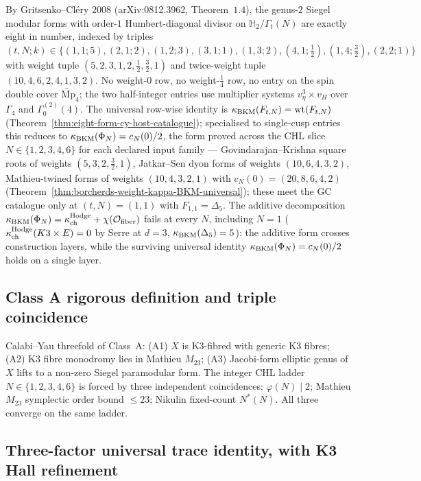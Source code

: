 By Gritsenko--Cl\'ery $2008$ (arXiv:0812.3962, Theorem~$1.4$), the
genus-$2$ Siegel modular forms with order-$1$ Humbert-diagonal divisor
on $\mathbb{H}_2/\Gamma_t(N)$ are exactly eight in number, indexed by
triples $(t, N; k) \in \{(1,1;5),(2,1;2),(1,2;3),(3,1;1),(1,3;2),
(4,1;\tfrac12),(1,4;\tfrac32),(2,2;1)\}$ with weight tuple
$(5, 2, 3, 1, 2, \tfrac12, \tfrac32, 1)$ and twice-weight tuple
$(10, 4, 6, 2, 4, 1, 3, 2)$. No weight-$0$ row, no weight-$\tfrac14$
row, no entry on the spin double cover $\widetilde{\mathrm{Mp}}_4$;
the two half-integer entries use multiplier systems
$v_\eta^3 \times v_H$ over $\Gamma_4$ and $\Gamma_0^{(2)}(4)$. The
universal row-wise identity is $\kappa_{\mathrm{BKM}}(F_{t, N}) = \mathrm{wt}(F_{t, N})$
(Theorem~\ref{thm:eight-form-cy-host-catalogue}); specialised to
single-cusp entries this reduces to $\kappa_{\mathrm{BKM}}(\Phi_N) = c_N(0)/2$, the
form proved across the CHL slice $N \in \{1, 2, 3, 4, 6\}$ for each
declared input family --- Govindarajan--Krishna square roots of
weights $(5, 3, 2, \tfrac32, 1)$, Jatkar--Sen dyon forms of weights
$(10, 6, 4, 3, 2)$, Mathieu-twined forms of weights
$(10, 4, 3, 2, 1)$ with $c_N(0) = (20, 8, 6, 4, 2)$
(Theorem~\ref{thm:borcherds-weight-kappa-BKM-universal}); these meet
the GC catalogue only at $(t, N) = (1, 1)$ with $F_{1, 1} = \Delta_5$.
The additive decomposition $\kappa_{\mathrm{BKM}}(\Phi_N) = \kappa_{\mathrm{ch}}^{\mathrm{Hodge}} + \chi(\mathcal{O}_{\mathrm{fiber}})$
fails at every $N$, including $N = 1$
($\kappa_{\mathrm{ch}}^{\mathrm{Hodge}}(K3\times E) = 0$ by Serre at $d = 3$,
$\kappa_{\mathrm{BKM}}(\Delta_5) = 5$): the additive form crosses construction layers,
while the surviving universal identity $\kappa_{\mathrm{BKM}}(\Phi_N) = c_N(0)/2$ holds on a
single layer.

\subsection{Class A rigorous definition and triple coincidence}
\label{subsec:v3-intro-class-A-rigorous}

Calabi--Yau threefold of Class~A: (A1) $X$ is K3-fibred with
generic K3 fibres; (A2) K3 fibre monodromy lies in Mathieu $M_{23}$;
(A3) Jacobi-form elliptic genus of $X$ lifts to a non-zero Siegel
paramodular form. The integer CHL ladder $N\in\{1,2,3,4,6\}$ is
forced by three independent coincidences: $\varphi(N)\mid 2$;
Mathieu $M_{23}$ symplectic order bound $\le 23$; Nikulin fixed-count
$N^*(N)$. All three converge on the same ladder.

\subsection{Three-factor universal trace identity, with K3 Hall refinement}
\label{subsec:v3-intro-three-factor-UTI}

